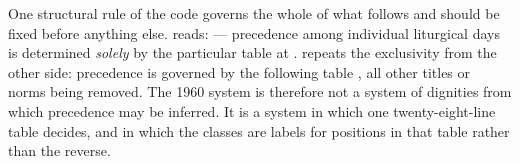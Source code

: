 One structural rule of the code governs the whole of what follows and should be fixed before
anything else.  reads:  — precedence among individual liturgical days is
determined \emph{solely} by the particular table at .  repeats the exclusivity
from the other side: precedence is governed by the following table , all other titles or norms being removed. The 1960 system is
therefore not a system of dignities from which precedence may be inferred. It is a system in
which one twenty-eight-line table decides, and in which the classes are labels for positions in
that table rather than the reverse.
